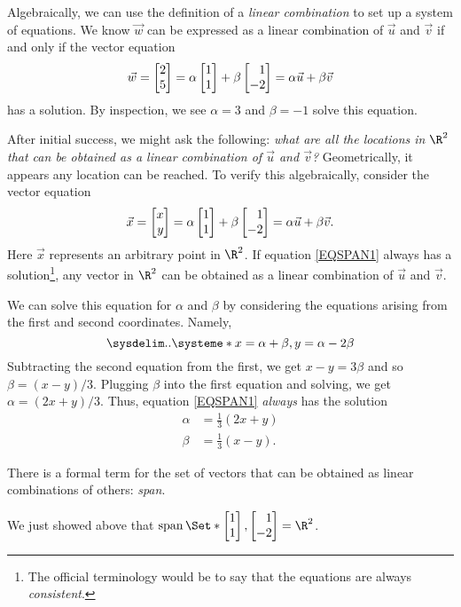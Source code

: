 Algebraically, we can use the definition of a \emph{linear combination} to set up a system of equations.
We know $\vec w$ can be expressed as a linear combination of $\vec u$ and $\vec v$ if and only if 
the vector equation
\[
	\vec w = \mat{2\\5}=\alpha\mat{1\\1}+\beta\mat{1\\-2}=\alpha \vec u+\beta \vec v
\]
has a solution. By inspection, we see $\alpha=3$ and $\beta=-1$ solve this equation.

After initial success, we might ask the following:
\emph{what are all the locations in $\R^2$ that can be obtained
as a linear combination of $\vec u$ and $\vec v$?} Geometrically, it appears
any location can be reached. To verify this algebraically, consider the vector equation
\begin{equation}
	\label{EQSPAN1}
	\vec x=\mat{x\\y} = \alpha\mat{1\\1}+\beta\mat{1\\-2} = \alpha\vec u+\beta\vec v.
\end{equation}
Here $\vec x$ represents an arbitrary point in $\R^2$. If equation \eqref{EQSPAN1} always
has a solution\footnote{ The official terminology would be to say that
the equations are always \emph{consistent}.}, any vector in $\R^2$ can be obtained as a linear combination of $\vec u$ and $\vec v$.

We can solve this equation for $\alpha$ and $\beta$ by considering the equations arising from the
first and second coordinates. Namely,
	\[
		\sysdelim..\systeme*{x=\alpha+\beta, y=\alpha-2\beta}
	\]
Subtracting the second equation from the first, we get $x-y=3\beta$ and so $\beta=(x-y)/3$. Plugging 
$\beta$ into the first equation and solving, we get $\alpha=(2x+y)/3$. Thus, equation \eqref{EQSPAN1}
\emph{always} has the solution
\begin{align*}
	\alpha &= \tfrac{1}{3}(2x+y)\\
	\beta &= \tfrac{1}{3}(x-y).
\end{align*}

There is a formal term for the set of vectors that can be obtained as linear combinations
of others: \emph{span}.


We just showed above that $\Span\Set*{\mat{1\\1},\mat{1\\-2}}=\R^2$.

